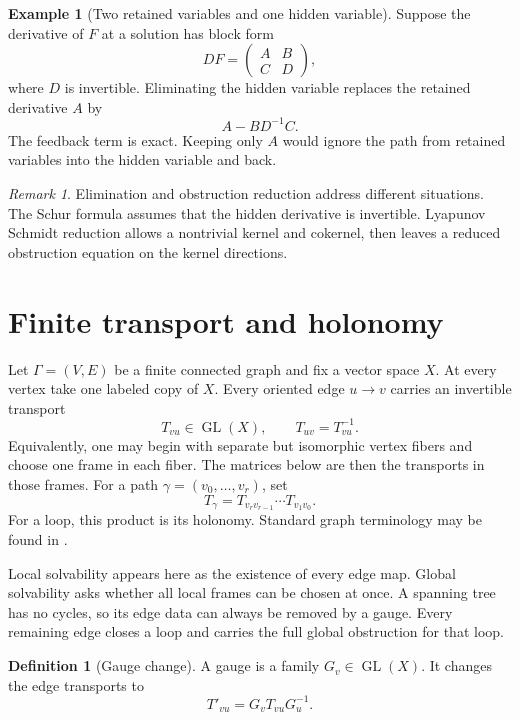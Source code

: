 \documentclass{aomart}
\theoremstyle{definition}
\newtheorem{definition}[definition]{Definition}
\newtheorem{example}[example]{Example}
\theoremstyle{remark}
\newtheorem{remark}[remark]{Remark}
\begin{document}
\begin{example}[Two retained variables and one hidden variable]\label{ex:finite_schur}
Suppose the derivative of $F$ at a solution has block form
\[
DF=
\begin{pmatrix}
A&B\\
C&D
\end{pmatrix},
\]
where $D$ is invertible.  Eliminating the hidden variable replaces the retained derivative $A$ by
\[
A-BD^{-1}C.
\]
The feedback term is exact.  Keeping only $A$ would ignore the path from retained variables into the hidden variable and back.
\end{example}

\begin{remark}\label{rem:elimination_vs_obstruction}
Elimination and obstruction reduction address different situations.  The Schur formula assumes that the hidden derivative is invertible.  Lyapunov Schmidt reduction allows a nontrivial kernel and cokernel, then leaves a reduced obstruction equation on the kernel directions.
\end{remark}

\section{Finite transport and holonomy}\label{sec:finite_holonomy}

Let $\Gamma=(V,E)$ be a finite connected graph and fix a vector space $X$.  At every vertex take one labeled copy of $X$.  Every oriented edge $u\to v$ carries an invertible transport
\[
T_{vu}\in\operatorname{GL}(X),
\qquad
T_{uv}=T_{vu}^{-1}.
\]
Equivalently, one may begin with separate but isomorphic vertex fibers and choose one frame in each fiber.  The matrices below are then the transports in those frames.  For a path $\gamma=(v_0,\ldots,v_r)$, set
\[
T_\gamma
=
T_{v_rv_{r-1}}\cdots T_{v_1v_0}.
\]
For a loop, this product is its holonomy.  Standard graph terminology may be found in \cite{GrossTucker1987}.

Local solvability appears here as the existence of every edge map.  Global solvability asks whether all local frames can be chosen at once.  A spanning tree has no cycles, so its edge data can always be removed by a gauge.  Every remaining edge closes a loop and carries the full global obstruction for that loop.

\begin{definition}[Gauge change]\label{def:gauge_change}
A gauge is a family $G_v\in\operatorname{GL}(X)$.  It changes the edge transports to
\[
T'_{vu}=G_vT_{vu}G_u^{-1}.
\]
\end{definition}
\end{document}
